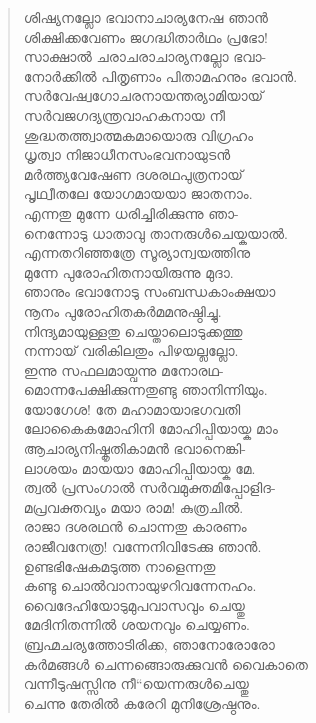 \begin{verse}
ശിഷ്യനല്ലോ ഭവാനാചാര്യനേഷ ഞാന്‍\\
ശിക്ഷിക്കവേണം ജഗദ്ധിതാര്‍ഥം പ്രഭോ!\\
സാക്ഷാല്‍ ചരാചരാചാര്യനല്ലോ ഭവാ-\\
നോര്‍ക്കില്‍ പിതൃണാം പിതാമഹനും ഭവാന്‍.\\
സര്‍വേഷ്വഗോചരനായന്തര്യാമിയായ്\\
സര്‍വജഗദ്യന്ത്രവാഹകനായ നീ\\
ശുദ്ധതത്ത്വാത്മകമായൊരു വിഗ്രഹം\\
ധൃത്വാ നിജാധീനസംഭവനായുടന്‍\\
മര്‍ത്ത്യവേഷേണ ദശരഥപുത്രനായ്\\
പൃഥ്വീതലേ യോഗമായയാ ജാതനാം.\\
എന്നതു മുന്നേ ധരിച്ചിരിക്കുന്നു ഞാ-\\
നെന്നോടു ധാതാവു താനരുള്‍ചെയ്കയാല്‍.\\
എന്നതറിഞ്ഞത്രേ സൂര്യാന്വയത്തിനു\\
മുന്നേ പുരോഹിതനായിരുന്നു മുദാ.\\
ഞാനും ഭവാനോടു സംബന്ധകാംക്ഷയാ\\
നൂനം പുരോഹിതകര്‍മമനുഷ്ഠിച്ചു.\\
നിന്ദ്യമായുള്ളതു ചെയ്താലൊടുക്കത്തു\\
നന്നായ് വരികിലതും പിഴയല്ലല്ലോ.\\
ഇന്നു സഫലമായ്വന്നു മനോരഥ-\\
മൊന്നപേക്ഷിക്കുന്നതുണ്ടു ഞാനിന്നിയും.\\
യോഗേശ! തേ മഹാമായാഭഗവതി\\
ലോകൈകമോഹിനി മോഹിപ്പിയായ്ക മാം\\
ആചാര്യനിഷ്കൃതികാമന്‍ ഭവാനെങ്കി-\\
ലാശയം മായയാ മോഹിപ്പിയായ്ക മേ.\\
ത്വല്‍ പ്രസംഗാല്‍ സര്‍വമുക്തമിപ്പോളിദ-\\
മപ്രവക്തവ്യം മയാ രാമ! കുത്രചില്‍.\\
രാജാ ദശരഥന്‍ ചൊന്നതു കാരണം\\
രാജീവനേത്ര! വന്നേനിവിടേക്കു ഞാന്‍.\\
ഉണ്ടഭിഷേകമടുത്ത നാളെന്നതു\\
കണ്ടു ചൊല്‍വാനായുഴറിവന്നേനഹം.\\
വൈദേഹിയോടുമുപവാസവും ചെയ്തു\\
മേദിനിതന്നില്‍ ശയനവും ചെയ്യണം.\\
ബ്രഹ്മചര്യത്തോടിരിക്ക, ഞാനോരോരോ\\
കര്‍മങ്ങള്‍ ചെന്നങ്ങൊരുക്കുവന്‍ വൈകാതെ\\
വന്നീടുഷസ്സിനു നീ“യെന്നരുള്‍ചെയ്തു\\
ചെന്നു തേരില്‍ കരേറി മുനിശ്രേഷ്ഠനും.\\

\end{verse}
